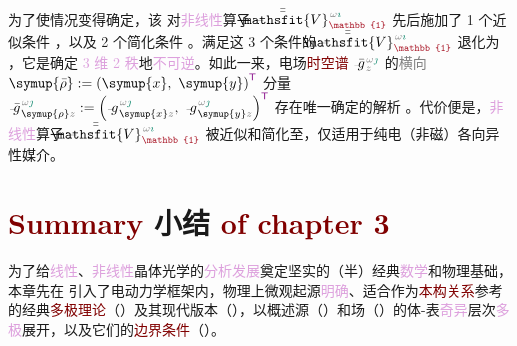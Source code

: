 为了使情况变得确定，该  对\textcolor{Plum}{非线性}算子 $\xint{\mathcolor{gray}{-}}{25}{\bar{\bar{\mathsfit{V}}}}^{\;\! \mathcolor{gray}{\omega} \textcolor{PineGreen}{\imath}}_{\textcolor{Maroon}{\mathbb{1}}}$ 先后施加了 1 个近似条件 ，以及 2 个简化条件 。满足这 3 个条件的 $\xint{\mathcolor{gray}{-}}{25}{\bar{\bar{\mathsfit{V}}}}^{\;\! \mathcolor{gray}{\omega} \textcolor{PineGreen}{\imath}}_{\textcolor{Maroon}{\mathbb{1}}}$ 退化为 ，它是确定 \textcolor{Plum}{3 维 2 秩}地\textcolor{Plum}{不可逆}。如此一来，电场\textcolor{Maroon}{时空谱} $\xint{{}^{}_{\mathcolor{gray}{-}}}{10}{\bar{g}}^{\;\!\mathcolor{gray}{\omega} \textcolor{PineGreen}{\jmath}}_{\;\! \mathcolor{gray}{z}}$ 的\textcolor{gray}{横向} $\symup{\bar{\rho}} := \left( \symup{x},~ \symup{y} \right)^{\mathsf{\textcolor{Plum}{T}}}$ 分量 $\xint{{}^{}_{\mathcolor{gray}{-}}}{10}{\bar{g}}^{\;\!\mathcolor{gray}{\omega} \textcolor{PineGreen}{\jmath}}_{\;\! \symup{\rho} \mathcolor{gray}{z}} := \left( \xint{{}^{}_{\mathcolor{gray}{-}}}{10}{g}^{\;\!\mathcolor{gray}{\omega} \textcolor{PineGreen}{\jmath}}_{\;\! \symup{x} \mathcolor{gray}{z}},~ \xint{{}^{}_{\mathcolor{gray}{-}}}{10}{g}^{\;\!\mathcolor{gray}{\omega} \textcolor{PineGreen}{\jmath}}_{\;\! \symup{y} \mathcolor{gray}{z}} \right)^{\mathsf{\textcolor{Plum}{T}}}$ 存在唯一确定的解析 。代价便是，\textcolor{Plum}{非线性}算子 $\xint{\mathcolor{gray}{-}}{25}{\bar{\bar{\mathsfit{V}}}}^{\;\! \mathcolor{gray}{\omega} \textcolor{PineGreen}{\imath}}_{\textcolor{Maroon}{\mathbb{1}}}$ 被近似和简化至，仅适用于\textcolor{PineGreen}{纯电（非磁）各向异性}媒介。

\clearpage

\section{\textcolor{Maroon}{Summary} 小结 \textcolor{Maroon}{of chapter 3}}\label{sec:summary-chapter3}

为了给\textcolor{Plum}{线性}、\textcolor{Plum}{非线性}\textcolor{PineGreen}{晶体光学}的\textcolor{Plum}{分析发展}奠定坚实的（\textcolor{NavyBlue}{半}）\textcolor{NavyBlue}{经典}\textcolor{Plum}{数学}和\textcolor{NavyBlue}{物理}基础，本章先在  引入了\textcolor{NavyBlue}{电动力学}框架内，\textcolor{NavyBlue}{物理上微观起源}\textcolor{Plum}{明确}、适合作为\textcolor{Maroon}{本构关系}参考的经典\textcolor{Maroon}{多极理论}（）及其现代版本（），以概述\textcolor{NavyBlue}{源}（）和\textcolor{NavyBlue}{场}（）的体-表\textcolor{Plum}{奇异}层次\textcolor{Plum}{多极}展开，以及它们的\textcolor{Maroon}{边界条件}（）。

